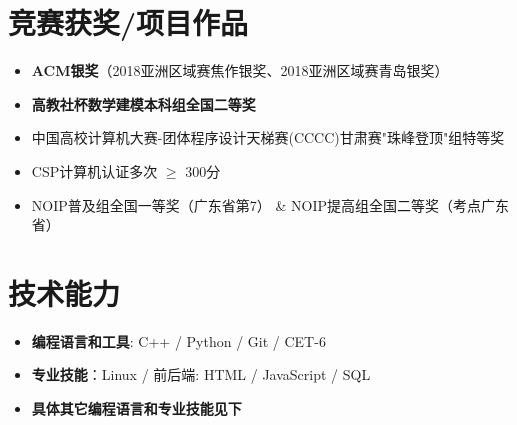 \documentclass{resume}
\begin{document}


\section{竞赛获奖/项目作品}
\begin{itemize}[parsep=0.2ex]
  \item \textbf{ACM银奖}（2018亚洲区域赛焦作银奖、2018亚洲区域赛青岛银奖）
  \item \textbf{高教社杯数学建模本科组全国二等奖}
  \item 中国高校计算机大赛-团体程序设计天梯赛(CCCC)甘肃赛"珠峰登顶"组特等奖
  \item CSP计算机认证多次 $\geq$ 300分
  \item NOIP普及组全国一等奖（广东省第7） \& NOIP提高组全国二等奖（考点广东省）
  
\end{itemize}


\section{技术能力}
\begin{itemize}[parsep=0.2ex]
	\item \textbf{编程语言和工具}: C++ / Python / Git / CET-6
	\item \textbf{专业技能}：Linux / 前后端: HTML / JavaScript / SQL
	\item \textbf{具体其它编程语言和专业技能见下}
\end{itemize}
\end{document}
